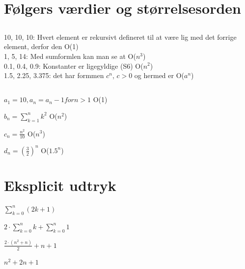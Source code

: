 \documentclass[12pt, a4paper, hidelinks]{article}
\begin{document}
\section{Følgers værdier og størrelsesorden}

\subsection{} 
10, 10, 10: Hvert element er rekursivt defineret til at være lig med det forrige element, derfor den O(1)\vspace{1.3mm}\\
1, 5, 14: Med sumformlen kan man se at O($n^3$)\vspace{1.3mm}\\
0.1, 0.4, 0.9: Konstanter er ligegyldige (S6) O($n^2$)\vspace{1.3mm}\\
1.5, 2.25, 3.375: det har formmen $c^n$, $c > 0$ og hermed er O($a^n$)\vspace{1.3mm}\\

\subsection{}

$a_1 = 10, a_n = a_n-1 for n > 1$ O(1)

$b_n = \sum\limits_{k=1}^n k^2 $ O($n^2$)

$c_n = \frac{n^2}{10}$ O($n^3$)

$d_n = (\frac 3 2)^n$ O($1.5^n$)

\newpage

\section{Eksplicit udtryk}

$\sum\limits_{k=0}^n (2k+1)$

$2\cdot\sum\limits_{k=0}^n k +\sum\limits_{k=0}^n 1$

$\frac{2\cdot(n^2+n)}{2} + n + 1$

$n^2+2n+ 1$


\end{document}
